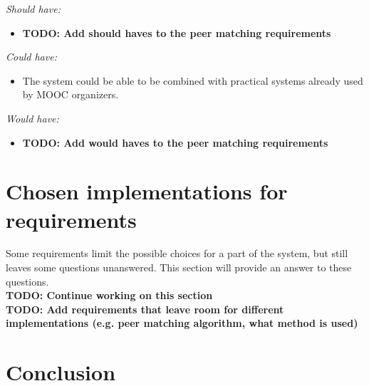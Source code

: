\documentclass[]{article}
\newcommand{\TODO}[1]{{\color{red}\textbf{TODO: #1}}}
\newcommand{\reqr}[1]{{\noindent\emph{#1:}}}
\begin{document}
\reqr{Should have}
\begin{itemize}
\item \TODO{Add should haves to the peer matching requirements}
\end{itemize}

\reqr{Could have}
\begin{itemize}
\item The system could be able to be combined with practical systems already used by MOOC organizers.
\end{itemize}

\reqr{Would have}
\begin{itemize}
\item \TODO{Add would haves to the peer matching requirements}
\end{itemize}

\section{Chosen implementations for requirements}
Some requirements limit the possible choices for a part of the system, but still leaves some questions unanswered.
This section will provide an answer to these questions.\\
\TODO{Continue working on this section}\\
\TODO{Add requirements that leave room for different implementations (e.g. peer matching algorithm, what method is used)}

\section{Conclusion}

\newpage


\end{document}
